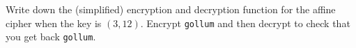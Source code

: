   Write down the (simplified) encryption and decryption
  function for the affine cipher when the key is $(3, 12)$.
  Encrypt \verb!gollum! and then decrypt to check that you
  get back \verb!gollum!.
